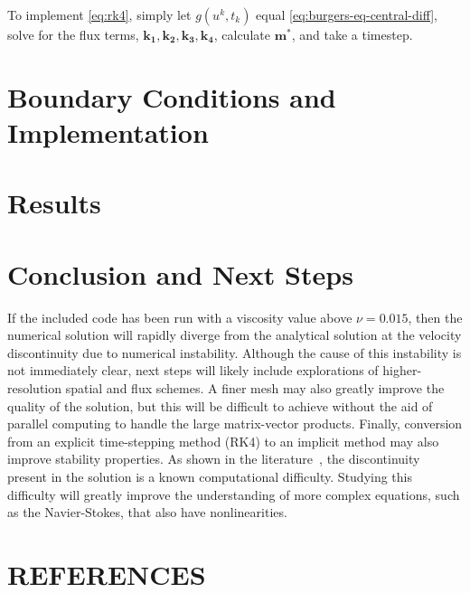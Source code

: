 \documentclass[ltr]{ornltm-app-mod} %
\numberwithin{equation}{section}
\begin{document}
    To implement \cref{eq:rk4}, simply let $g(u^k,t_k)$ equal \cref{eq:burgers-eq-central-diff}, solve for the flux terms, $\mathbf{k_1},\mathbf{k_2},\mathbf{k_3},\mathbf{k_4}$, calculate $\mathbf{m^*}$, and take a timestep.


    \section{Boundary Conditions and Implementation}\label{sec:boundary-conditions-and-implementation}
    


    \section{Results}\label{sec:results}
    
    \clearpage


    \section{Conclusion and Next Steps}\label{sec:conclusion}
    If the included code has been run with a viscosity value above $\nu=0.015$, then the numerical solution will rapidly diverge from the analytical solution at the velocity discontinuity due to numerical instability.
    Although the cause of this instability is not immediately clear, next steps will likely include explorations of higher-resolution spatial and flux schemes.
    A finer mesh may also greatly improve the quality of the solution, but this will be difficult to achieve without the aid of parallel computing to handle the large matrix-vector products.
    Finally, conversion from an explicit time-stepping method (RK4) to an implicit method may also improve stability properties.
    As shown in the literature~\autocite{cameronNOTESBURGERSEQUATION,salihBurgersEquation2016}, the discontinuity present in the solution is a known computational difficulty.
    Studying this difficulty will greatly improve the understanding of more complex equations, such as the Navier-Stokes, that also have nonlinearities.





    \section{REFERENCES}%
    \printbibliography[heading=none]%
\end{document}
